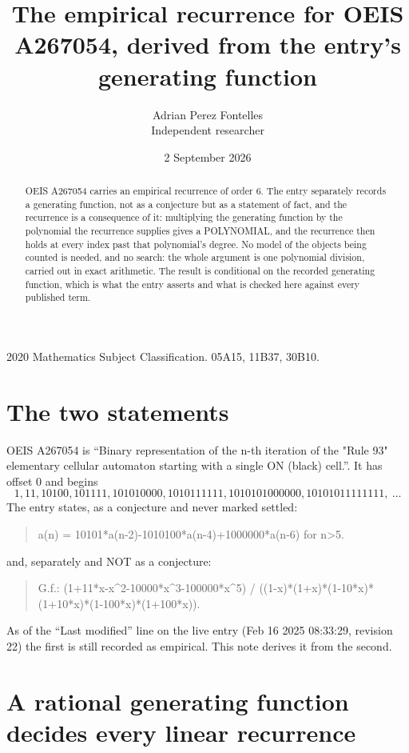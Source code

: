 \documentclass[11pt,a4paper]{article}
\title{The empirical recurrence for OEIS A267054, derived from the entry's generating function}
\author{Adrian Perez Fontelles\\ \small Independent researcher}
\date{2 September 2026}
\theoremstyle{plain}
\theoremstyle{definition}
\begin{document}
\maketitle

\begin{abstract}
OEIS A267054 carries an empirical recurrence of order $6$. The entry separately records a
generating function, not as a conjecture but as a statement of fact, and the recurrence is a
consequence of it: multiplying the generating function by the polynomial the recurrence
supplies gives a POLYNOMIAL, and the recurrence then holds at every index past that
polynomial's degree. No model of the objects being counted is needed, and no search: the
whole argument is one polynomial division, carried out in exact arithmetic. The result is
conditional on the recorded generating function, which is what the entry asserts and what is
checked here against every published term.
\end{abstract}

\noindent\small 2020 Mathematics Subject Classification. 05A15, 11B37, 30B10.\normalsize

\section{The two statements}

OEIS A267054 is ``Binary representation of the n-th iteration of the "Rule 93" elementary cellular automaton starting with a single ON (black) cell.''. It has offset $0$ and begins
\[
1, 11, 10100, 101111, 101010000, 1010111111, 1010101000000, 10101011111111,\ \dots
\]
The entry states, as a conjecture and never marked settled:
\begin{quote}
a(n) = 10101*a(n-2)-1010100*a(n-4)+1000000*a(n-6) for n>5.
\end{quote}
and, separately and NOT as a conjecture:
\begin{quote}
G.f.: (1+11*x-x\^{}2-10000*x\^{}3-100000*x\^{}5) / ((1-x)*(1+x)*(1-10*x)*(1+10*x)*(1-100*x)*(1+100*x)).
\end{quote}
As of the ``Last modified'' line on the live entry (Feb 16 2025 08:33:29, revision 22) the first is still
recorded as empirical. This note derives it from the second.

\section{A rational generating function decides every linear recurrence}
\end{document}
